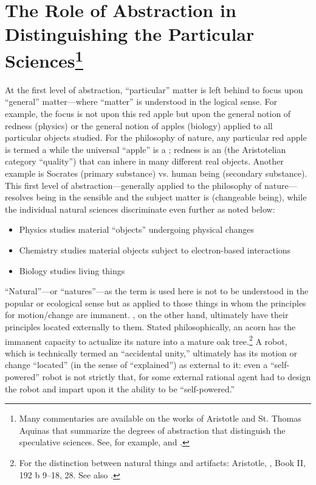\section[The Role of Abstraction]{The Role of Abstraction in Distinguishing the Particular Sciences\footnote{Many commentaries are available on the works of Aristotle and St. Thomas Aquinas that summarize the degrees of abstraction that distinguish the speculative sciences. See, for example, \citet[][pgs. 35--36]{maritain1959} and \citet[][pgs. 51--53]{velde2006}.}}

At the first level of abstraction, ``particular'' matter is left behind to focus upon ``general'' matter---where ``matter'' is understood in the logical sense. For example, the focus is not upon this red apple but upon the general notion of redness (physics) or the general notion of apples (biology)  applied to all particular objects studied. For the philosophy of nature, any particular red apple is termed a  while the universal ``apple'' is a ; redness is an  (the Aristotelian category ``quality'') that can inhere in many different real objects. Another example is Socrates (primary substance) vs. human being (secondary substance). This first level of abstraction---generally applied to the philosophy of nature---resolves being in the sensible and the subject matter is  (changeable being), while the individual natural sciences discriminate even further as noted below:

\begin{itemize}
\item Physics studies  material ``objects'' undergoing physical changes
\item Chemistry studies  material objects subject to electron-based interactions
\item Biology studies  living things
\end{itemize}

``Natural''---or ``natures''---as the term is used here is not to be understood in the popular or ecological sense but as applied to those things in whom the principles for motion/change are immanent. , on the other hand, ultimately have their principles located externally to them. Stated philosophically, an acorn has the immanent capacity to actualize its nature into a mature oak tree.\footnote{For the distinction between natural things and artifacts: Aristotle, , Book II, 192 b 9--18, 28. See also \citet{stump2006}.} A robot, which is technically termed an ``accidental unity,'' ultimately has its motion or change ``located'' (in the sense of ``explained'') as external to it: even a ``self-powered'' robot is not strictly that, for some external rational agent had to design the robot and impart upon it the ability to be ``self-powered.''

